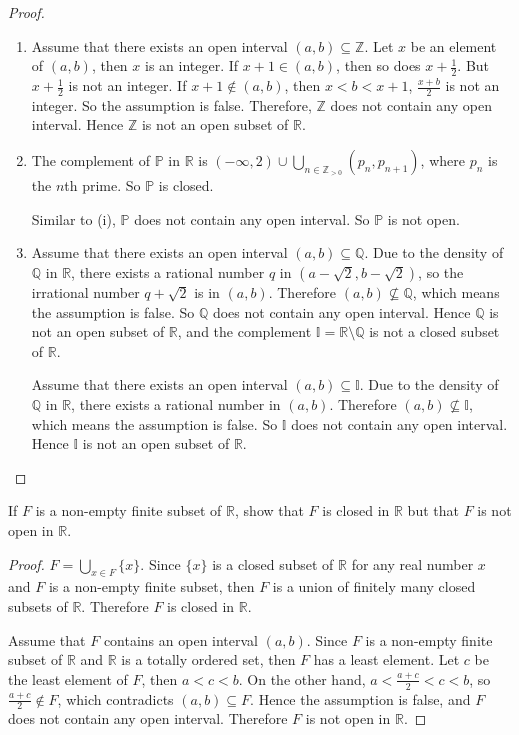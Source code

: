 \begin{proof}
	\begin{enumerate}[label={(\roman*)}]
		\item Assume that there exists an open interval $(a, b)\subseteq \mathbb{Z}$. Let $x$ be an element of $(a, b)$, then $x$ is an integer. If $x+1\in (a, b)$, then so does $x+\frac{1}{2}$. But $x+\frac{1}{2}$ is not an integer. If $x+1\notin (a, b)$, then $x < b < x+1$, $\frac{x+b}{2}$ is not an integer. So the assumption is false. Therefore, $\mathbb{Z}$ does not contain any open interval. Hence $\mathbb{Z}$ is not an open subset of $\mathbb{R}$.
		\item The complement of $\mathbb{P}$ in $\mathbb{R}$ is $(-\infty, 2)\cup\bigcup_{n\in\mathbb{Z}_{>0}} (p_{n}, p_{n+1})$, where $p_{n}$ is the $n$th prime. So $\mathbb{P}$ is closed.

		      Similar to (i), $\mathbb{P}$ does not contain any open interval. So $\mathbb{P}$ is not open.
		\item Assume that there exists an open interval $(a, b)\subseteq \mathbb{Q}$. Due to the density of $\mathbb{Q}$ in $\mathbb{R}$, there exists a rational number $q$ in $(a - \sqrt{2}, b - \sqrt{2})$, so the irrational number $q + \sqrt{2}$ is in $(a, b)$. Therefore $(a, b)\nsubseteq \mathbb{Q}$, which means the assumption is false. So $\mathbb{Q}$ does not contain any open interval. Hence $\mathbb{Q}$ is not an open subset of $\mathbb{R}$, and the complement $\mathbb{I} = \mathbb{R}\setminus\mathbb{Q}$ is not a closed subset of $\mathbb{R}$.

		      Assume that there exists an open interval $(a, b)\subseteq \mathbb{I}$. Due to the density of $\mathbb{Q}$ in $\mathbb{R}$, there exists a rational number in $(a, b)$. Therefore $(a, b)\nsubseteq \mathbb{I}$, which means the assumption is false. So $\mathbb{I}$ does not contain any open interval. Hence $\mathbb{I}$ is not an open subset of $\mathbb{R}$.
	\end{enumerate}
\end{proof}
\newpage

\begin{exercise}
	If $F$ is a non-empty finite subset of $\mathbb{R}$, show that $F$ is closed in $\mathbb{R}$ but that $F$ is not open in $\mathbb{R}$.
\end{exercise}

\begin{proof}
	$F = \bigcup_{x\in F}\{ x \}$. Since $\{ x \}$ is a closed subset of $\mathbb{R}$ for any real number $x$ and $F$ is a non-empty finite subset, then $F$ is a union of finitely many closed subsets of $\mathbb{R}$. Therefore $F$ is closed in $\mathbb{R}$.

	Assume that $F$ contains an open interval $(a, b)$. Since $F$ is a non-empty finite subset of $\mathbb{R}$ and $\mathbb{R}$ is a totally ordered set, then $F$ has a least element. Let $c$ be the least element of $F$, then $a < c < b$. On the other hand, $a < \frac{a+c}{2} < c < b$, so $\frac{a+c}{2}\notin F$, which contradicts $(a, b)\subseteq F$. Hence the assumption is false, and $F$ does not contain any open interval. Therefore $F$ is not open in $\mathbb{R}$.
\end{proof}
\newpage

